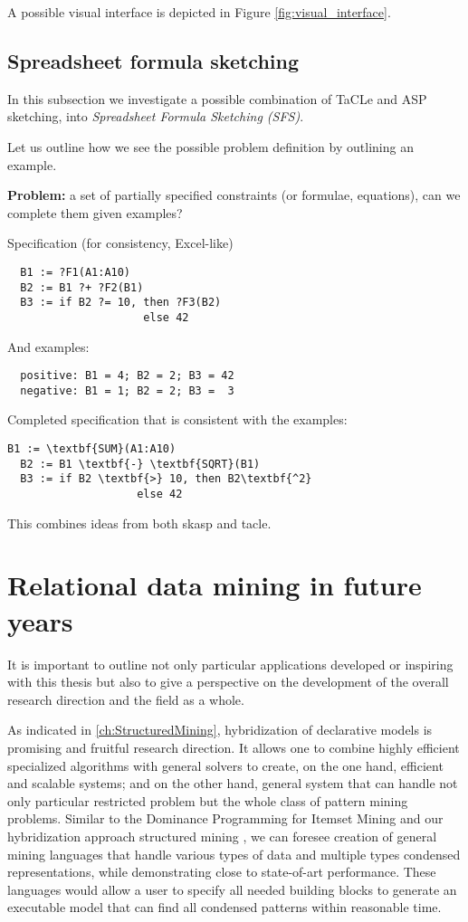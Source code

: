 A possible visual interface is depicted in Figure \ref{fig:visual_interface}.

\subsection{Spreadsheet formula sketching}
In this subsection we investigate a possible combination of TaCLe and
ASP sketching, into \textit{Spreadsheet Formula Sketching (SFS)}.

Let us outline how we see the possible problem definition by
outlining an example.

\textbf{Problem:} a set of partially specified constraints (or formulae, equations), can we complete them given examples?
 
  Specification (for consistency, Excel-like)
  \begin{verbatim}
  B1 := ?F1(A1:A10)
  B2 := B1 ?+ ?F2(B1)
  B3 := if B2 ?= 10, then ?F3(B2)
                     else 42
  \end{verbatim}
  And examples:
  \begin{verbatim}
  positive: B1 = 4; B2 = 2; B3 = 42 
  negative: B1 = 1; B2 = 2; B3 =  3
  \end{verbatim}
  

  Completed specification that is consistent with the examples:
  \begin{Verbatim}[commandchars=\\\{\}]
  B1 := \textbf{SUM}(A1:A10)
  B2 := B1 \textbf{-} \textbf{SQRT}(B1)
  B3 := if B2 \textbf{>} 10, then B2\textbf{^2}
                    else 42
  \end{Verbatim}

This combines ideas from both \acrshort{skasp} and \acrshort{tacle}.
  

\section{Relational data mining in future years}
It is important to outline not only particular applications developed
or inspiring with this thesis but also to give a perspective on the
development of the overall research direction and the field as a
whole.

As indicated in \ref{ch:StructuredMining}, hybridization of
declarative models is promising and fruitful research direction. It
allows one to combine highly efficient specialized algorithms with
general solvers to create, on the one hand, efficient and scalable
systems; and on the other hand, general system that can handle not
only particular restricted problem but the whole class of pattern
mining problems. Similar to the Dominance Programming for Itemset
Mining \cite{dominanceprogramming} and our hybridization approach structured mining \cite{ruleml_hybrid}, we can foresee creation of 
general mining languages that handle various types of data and
multiple types condensed representations, while demonstrating close to
state-of-art performance. These languages would allow a user to
specify all needed building blocks to generate an executable model
that can find all condensed patterns within reasonable time.

